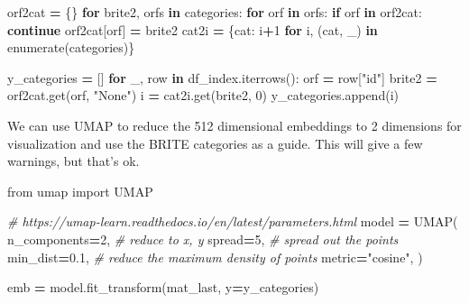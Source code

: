 \documentclass[
]{book}
\newenvironment{Shaded}{\begin{snugshade}}{\end{snugshade}}
\newcommand{\BuiltInTok}[1]{#1}
\newcommand{\CommentTok}[1]{\textcolor[rgb]{0.56,0.35,0.01}{\textit{#1}}}
\newcommand{\ControlFlowTok}[1]{\textcolor[rgb]{0.13,0.29,0.53}{\textbf{#1}}}
\newcommand{\DecValTok}[1]{\textcolor[rgb]{0.00,0.00,0.81}{#1}}
\newcommand{\FloatTok}[1]{\textcolor[rgb]{0.00,0.00,0.81}{#1}}
\newcommand{\ImportTok}[1]{#1}
\newcommand{\KeywordTok}[1]{\textcolor[rgb]{0.13,0.29,0.53}{\textbf{#1}}}
\newcommand{\NormalTok}[1]{#1}
\newcommand{\OperatorTok}[1]{\textcolor[rgb]{0.81,0.36,0.00}{\textbf{#1}}}
\newcommand{\StringTok}[1]{\textcolor[rgb]{0.31,0.60,0.02}{#1}}
\begin{document}
\begin{Shaded}
\begin{Highlighting}[numbers=left,,]
\NormalTok{orf2cat }\OperatorTok{=}\NormalTok{ \{\}}
\ControlFlowTok{for}\NormalTok{ brite2, orfs }\KeywordTok{in}\NormalTok{ categories:}
    \ControlFlowTok{for}\NormalTok{ orf }\KeywordTok{in}\NormalTok{ orfs:}
        \ControlFlowTok{if}\NormalTok{ orf }\KeywordTok{in}\NormalTok{ orf2cat: }\ControlFlowTok{continue}
\NormalTok{        orf2cat[orf] }\OperatorTok{=}\NormalTok{ brite2}
\NormalTok{cat2i }\OperatorTok{=}\NormalTok{ \{cat: i}\OperatorTok{+}\DecValTok{1} \ControlFlowTok{for}\NormalTok{ i, (cat, \_) }\KeywordTok{in} \BuiltInTok{enumerate}\NormalTok{(categories)\}}

\NormalTok{y\_categories }\OperatorTok{=}\NormalTok{ []}
\ControlFlowTok{for}\NormalTok{ \_, row }\KeywordTok{in}\NormalTok{ df\_index.iterrows():}
\NormalTok{    orf }\OperatorTok{=}\NormalTok{ row[}\StringTok{"id"}\NormalTok{]}
\NormalTok{    brite2 }\OperatorTok{=}\NormalTok{ orf2cat.get(orf, }\StringTok{"None"}\NormalTok{)}
\NormalTok{    i }\OperatorTok{=}\NormalTok{ cat2i.get(brite2, }\DecValTok{0}\NormalTok{)}
\NormalTok{    y\_categories.append(i)}
\end{Highlighting}
\end{Shaded}

We can use UMAP to reduce the 512 dimensional embeddings to 2 dimensions for visualization
and use the BRITE categories as a guide. This will give a few warnings, but that's ok.

\begin{Shaded}
\begin{Highlighting}[numbers=left,,]
\ImportTok{from}\NormalTok{ umap }\ImportTok{import}\NormalTok{ UMAP}

\CommentTok{\# https://umap{-}learn.readthedocs.io/en/latest/parameters.html}
\NormalTok{model }\OperatorTok{=}\NormalTok{ UMAP(}
\NormalTok{    n\_components}\OperatorTok{=}\DecValTok{2}\NormalTok{, }\CommentTok{\# reduce to x, y}
\NormalTok{    spread}\OperatorTok{=}\DecValTok{5}\NormalTok{,       }\CommentTok{\# spread out the points}
\NormalTok{    min\_dist}\OperatorTok{=}\FloatTok{0.1}\NormalTok{,   }\CommentTok{\# reduce the maximum density of points}
\NormalTok{    metric}\OperatorTok{=}\StringTok{"cosine"}\NormalTok{,}
\NormalTok{)}

\NormalTok{emb }\OperatorTok{=}\NormalTok{ model.fit\_transform(mat\_last, y}\OperatorTok{=}\NormalTok{y\_categories)}
\end{Highlighting}
\end{Shaded}
\end{document}
